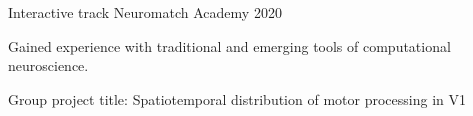 

\begin{cventries}

  \cventry
    {Interactive track} %
    {Neuromatch Academy} %
    {} %
    {2020} %
    {
      \begin{cvitems} %
        \item {Gained experience with traditional and emerging tools of computational neuroscience.}
        \item {Group project title: Spatiotemporal distribution of motor processing in V1}
      \end{cvitems}
    }
    
\end{cventries}
